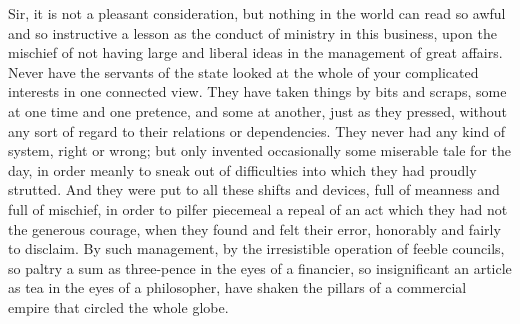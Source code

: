 Sir, it is not a pleasant consideration, but nothing in the world can read so awful and so instructive a lesson as the conduct of ministry in this business, upon the mischief of not having large and liberal ideas in the management of great affairs. Never have the servants of the state looked at the whole of your complicated interests in one connected view. They have taken things by bits and scraps, some at one time and one pretence, and some at another, just as they pressed, without any sort of regard to their relations or dependencies. They never had any kind of system, right or wrong; but only invented occasionally some miserable tale for the day, in order meanly to sneak out of difficulties into which they had proudly strutted. And they were put to all these shifts and devices, full of meanness and full of mischief, in order to pilfer piecemeal a repeal of an act which they had not the generous courage, when they found and felt their error, honorably and fairly to disclaim. By such management, by the irresistible operation of feeble councils, so paltry a sum as three-pence in the eyes of a financier, so insignificant an article as tea in the eyes of a philosopher, have shaken the pillars of a commercial empire that circled the whole globe.

